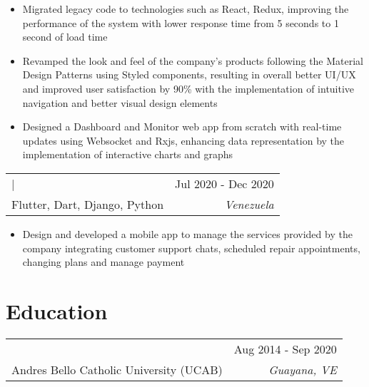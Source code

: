 \documentclass[letterpaper,10.8pt]{article}
\makeatletter
\newcommand{\normalFont}[1]{\fontsize{9.5pt}{11pt}{\selectfont{#1}}}
\newcommand{\largeFont}[1]{\fontsize{11pt}{11pt}{\selectfont{#1}}}
\newcommand{\resumeItem}[2]{
  \item{
      { #2 \vspace{-3.4pt}}
    }
  }
\newcommand{\resumeSubheading}[5]{
    \begin{tabular*}{1\textwidth}{l@{\extracolsep{\fill}}r}
      \largeFont{\color{mypink1}\textbf{#1}} | \normalFont{#3} & \small{#4} \\
      {\normalFont{Stack: } #5} & \textit{\small #2} \\
    \end{tabular*}\vspace{-8pt}
  }
\newcommand{\educationSubheading}[4]{
    \begin{tabular*}{1\textwidth}{l@{\extracolsep{\fill}}r}
      \largeFont{\textbf{\color{mypink1}{#1}}} & \small{#4} \\
      {\small #3} & \textit{\small #2} \\
    \end{tabular*}\vspace{-5pt}
  }
\newcommand{\resumeItemListStart}{\begin{itemize}}
\newcommand{\resumeItemListEnd}{\end{itemize}\vspace{4pt}}
\makeatother
\begin{document}
\resumeItemListStart
\resumeItem{Legacy Code Migration Specialist}
{Migrated legacy code to technologies such as React, Redux, improving the performance of the system with lower response time from 5 seconds to 1 second of load time }
\resumeItem{Material Design Expert}
{Revamped the look and feel of the company’s products following the Material Design Patterns using Styled components, resulting in overall better UI/UX and improved user satisfaction by 90\% with the implementation of intuitive navigation and better visual design elements }
\resumeItem{Dashboard and Monitor Web App Designer}
{Designed a Dashboard and Monitor web app from scratch with real-time updates using Websocket and Rxjs, enhancing data representation by the implementation of interactive charts and graphs}
\resumeItemListEnd

\resumeSubheading
{Mobile Developer - Freelance}{ Venezuela }
{NextLine}{ Jul 2020 - Dec 2020 }
{Flutter, Dart, Django, Python}

\resumeItemListStart
\resumeItem{Crypto Gaming Web App Designer}
{Design and developed a mobile app to manage the services provided by the company integrating customer support chats, scheduled repair appointments, changing plans and manage payment }
\resumeItemListEnd

\vspace{-8pt}
\section{Education}
\educationSubheading
{Bachelor of Computer Science}{Guayana, VE}
{Andres Bello Catholic University (UCAB)}{Aug 2014 - Sep 2020}
\end{document}
